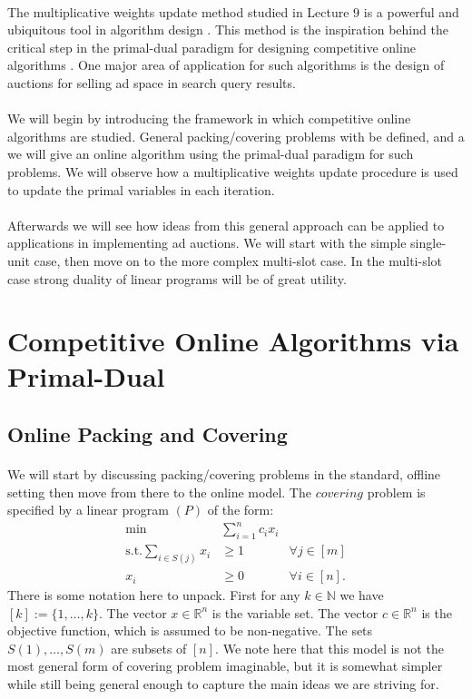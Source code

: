 \documentclass[letterpaper,12pt,oneside,onecolumn]{article}
\newcommand{\N}{\mathbb{N}} \newcommand{\R}{\mathbb{R}}
\begin{document}
\paragraph{}
The multiplicative weights update method studied in Lecture $9$ is a powerful and ubiquitous tool in algorithm design \cite{arora2012multiplicative}. This method is the inspiration behind the critical step in the primal-dual paradigm for designing competitive online algorithms \cite{buchbinder2009design}. One major area of application for such algorithms is the design of auctions for selling ad space in search query results.
\paragraph{}
We will begin by introducing the framework in which competitive online algorithms are studied. General packing/covering problems with be defined, and a we will give an online algorithm using the primal-dual paradigm for such problems. We will observe how a multiplicative weights update procedure is used to update the primal variables in each iteration. 
\paragraph{}
Afterwards we will see how ideas from this general approach can be applied to applications in implementing ad auctions. We will start with the simple single-unit case, then move on to the more complex multi-slot case. In the multi-slot case strong duality of linear programs will be of great utility.
\section{Competitive Online Algorithms via Primal-Dual}
\subsection{Online Packing and Covering}
\paragraph{}
We will start by discussing packing/covering problems in the standard, offline setting then move from there to the online model. The $\textit{covering}$ problem is specified by a linear program $(P)$ of the form:
\begin{align*}
\min &\sum_{i=1}^n c_i x_i \\
\text{s.t.} \sum_{i \in S(j)} x_i &\geq 1 &\forall j \in [m]\\
x_i &\geq 0 &\forall  i \in [n].
\end{align*}
There is some notation here to unpack. First for any $k \in \N$ we have $[k] := \{1, \dots, k\}$. The vector $x \in \R^n$ is the variable set. The vector $c \in \R^n$ is the objective function, which is assumed to be non-negative. The sets $S(1), \dots, S(m)$ are subsets of $[n]$. We note here that this model is not the most general form of covering problem imaginable, but it is somewhat simpler while still being general enough to capture the main ideas we are striving for. 
\end{document}

